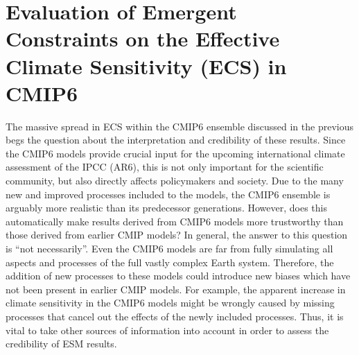 
%



\chapter{Evaluation of Emergent Constraints on the Effective Climate
  Sensitivity (\acs{ECS}) in \acs{CMIP}6}
\label{ch:05:paper_ecs}

The massive spread in \ac{ECS} within the \acs{CMIP}6 ensemble discussed in the
previous  begs the question about the
interpretation and credibility of these results. Since the \acs{CMIP}6 models
provide crucial input for the upcoming international climate assessment of the
\ac{IPCC} (\acs{AR}6), this is not only important for the scientific community,
but also directly affects policymakers and society. Due to the many new and
improved processes included to the models, the \acs{CMIP}6 ensemble is arguably
more realistic than its predecessor generations. However, does this
automatically make results derived from \acs{CMIP}6 models more trustworthy
than those derived from earlier \ac{CMIP} models? In general, the answer to
this question is \enquote{not necessarily}. Even the \acs{CMIP}6 models are far
from fully simulating all aspects and processes of the full vastly complex
Earth system. Therefore, the addition of new processes to these models could
introduce new biases which have not been present in earlier \ac{CMIP} models.
For example, the apparent increase in climate sensitivity in the \acs{CMIP}6
models might be wrongly caused by missing processes that cancel out the effects
of the newly included processes. Thus, it is vital to take other sources of
information into account in order to assess the credibility of \ac{ESM}
results.


